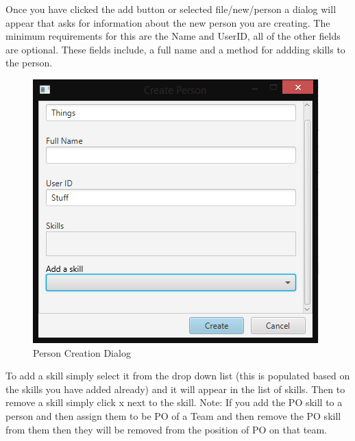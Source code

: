 Once you have clicked the add button or selected file/new/person a dialog will appear that asks for information about the new person you are creating. The minimum requirements for this are the Name and UserID, all of the other fields are optional. These fields include, a full name and a method for addding skills to the person.

\begin{figure}[H]
\centering
\includegraphics[width=\textwidth]{images/screenshots/people2.PNG}
\caption{Person Creation Dialog}
\label{fig:new_project}
\end{figure}

To add a skill simply select it from the drop down list (this is populated based on the skills you have added already) and it will appear in the list of skills. Then to remove a skill simply click x next to the skill. Note: If you add the PO skill to a person and then assign them to be PO of a Team and then remove the PO skill from them then they will be removed from the position of PO on that team.

